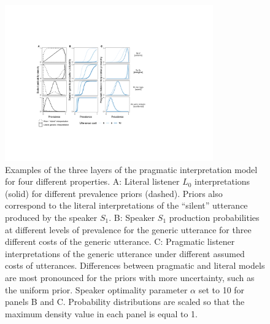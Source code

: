 \documentclass[floatsintext,doc]{apa6}
\begin{document}
\begin{figure}
\centering
\includegraphics[width=0.8\textwidth]{figs/tripartite.pdf}
\vspace{0.5cm}
\caption{Examples of the three layers of the pragmatic interpretation model for four different properties. A: Literal listener $L_0$ interpretations (solid) for different prevalence priors (dashed). Priors also correspond to the literal interpretations of the ``silent'' utterance produced by the speaker $S_1$. B: Speaker $S_1$ production probabilities at different levels of prevalence for the generic utterance for three different costs of the generic utterance. C: Pragmatic listener interpretations of the generic utterance under different assumed costs of utterances. Differences between pragmatic and literal models are most pronounced for the priors with more uncertainty, such as the uniform prior. Speaker optimality parameter $\alpha$ set to 10 for panels B and C. Probability distributions are scaled so that the maximum density value in each panel is equal to 1. }
\label{fig:tripartite}
\end{figure}
\end{document}
